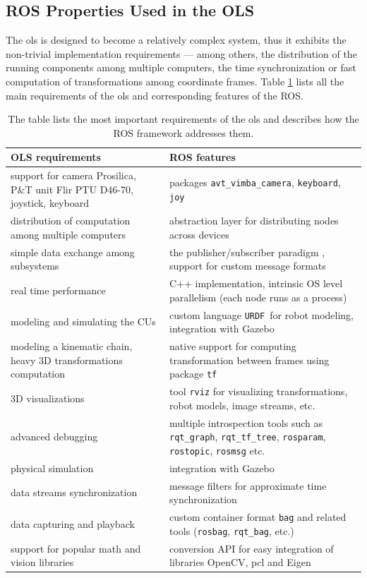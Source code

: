 \subsection{ROS Properties Used in the OLS} \label{txt:ros_properties_used_in_ols}

The \gls{ols} is designed to become a relatively complex system, thus it exhibits the non-trivial implementation requirements --- among others, the distribution of the running components among multiple computers, the time synchronization or fast computation of transformations among coordinate frames. Table \ref{tab:ols_requirements_ros_features} lists all the main requirements of the \gls{ols} and corresponding features of the ROS.

{\renewcommand{\arraystretch}{1.3}
	\begin{table}[!htbp]
		\centering
		\caption{The table lists the most important requirements of the \gls{ols} and describes how the ROS framework addresses them.}
		\begin{tabularx}{0.99\textwidth}{XX}
			\toprule
			\textbf{OLS requirements} & \textbf{ROS features} \\
			\midrule
			support for camera Prosilica, P\&T unit Flir PTU D46-70, joystick, keyboard & packages \texttt{avt\_vimba\_camera}, \texttt{keyboard}, \texttt{joy} \\
			distribution of computation among multiple computers & abstraction layer for distributing nodes across devices \\
			simple data exchange among subsystems & the publisher/subscriber paradigm \cite{O'Kane201310}, support for custom message formats \\
			real time performance & C++ implementation, intrinsic OS level parallelism (each node runs as a process) \\
			modeling and simulating the CUs & custom language \texttt{URDF}\footnotemark ~for robot modeling, integration with Gazebo \\
			modeling a kinematic chain, heavy 3D transformations computation & native support for computing transformation between frames using package \texttt{tf} \\
			3D visualizations & tool \texttt{rviz} for visualizing transformations, robot models, image streams, etc. \\
			advanced debugging & multiple introspection tools such as \texttt{rqt\_graph}, \texttt{rqt\_tf\_tree}, \texttt{rosparam}, \texttt{rostopic}, \texttt{rosmsg} etc. \\
			physical simulation & integration with Gazebo \\
			data streams synchronization & message filters for approximate time synchronization \\
			data capturing and playback & custom container format \texttt{bag} and related tools (\texttt{rosbag}, \texttt{rqt\_bag}, etc.) \\
			support for popular math and vision libraries & conversion API for easy integration of libraries OpenCV, \gls{pcl} and Eigen \\
			\bottomrule
		\end{tabularx}
		\label{tab:ols_requirements_ros_features}
	\end{table}
}
	

